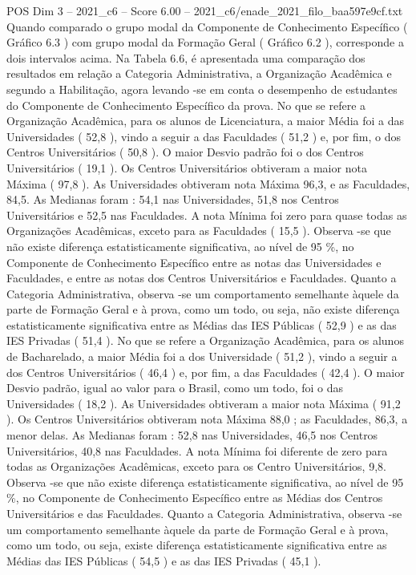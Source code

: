 \begin{textsample}{POS Dim 3 – 2021\_c6 – Score 6.00 – 2021\_c6/enade\_2021\_filo\_baa597e9cf.txt}
Quando comparado o grupo modal da Componente de Conhecimento Específico ( Gráfico 6.3 ) com grupo modal da Formação Geral ( Gráfico 6.2 ), corresponde a dois intervalos acima.
Na Tabela 6.6, é apresentada uma comparação dos resultados em relação a Categoria Administrativa, a Organização Acadêmica e segundo a Habilitação, agora levando -se em conta o desempenho de estudantes do Componente de Conhecimento Específico da prova.
No que se refere a Organização Acadêmica, para os alunos de Licenciatura, a maior Média foi a das Universidades ( 52,8 ), vindo a seguir a das Faculdades ( 51,2 ) e, por fim, o dos Centros Universitários ( 50,8 ).
O maior Desvio padrão foi o dos Centros Universitários ( 19,1 ).
Os Centros Universitários obtiveram a maior nota Máxima ( 97,8 ).
As Universidades obtiveram nota Máxima 96,3, e as Faculdades, 84,5.
As Medianas foram : 54,1 nas Universidades, 51,8 nos Centros Universitários e 52,5 nas Faculdades.
A nota Mínima foi zero para quase todas as Organizações Acadêmicas, exceto para as Faculdades ( 15,5 ).
Observa -se que não existe diferença estatisticamente significativa, ao nível de 95 \%, no Componente de Conhecimento Específico entre as notas das Universidades e Faculdades, e entre as notas dos Centros Universitários e Faculdades.
Quanto a Categoria Administrativa, observa -se um comportamento semelhante àquele da parte de Formação Geral e à prova, como um todo, ou seja, não existe diferença estatisticamente significativa entre as Médias das IES Públicas ( 52,9 ) e as das IES Privadas ( 51,4 ).
No que se refere a Organização Acadêmica, para os alunos de Bacharelado, a maior Média foi a dos Universidade ( 51,2 ), vindo a seguir a dos Centros Universitários ( 46,4 ) e, por fim, a das Faculdades ( 42,4 ).
O maior Desvio padrão, igual ao valor para o Brasil, como um todo, foi o das Universidades ( 18,2 ).
As Universidades obtiveram a maior nota Máxima ( 91,2 ).
Os Centros Universitários obtiveram nota Máxima 88,0 ; as Faculdades, 86,3, a menor delas.
As Medianas foram : 52,8 nas Universidades, 46,5 nos Centros Universitários, 40,8 nas Faculdades.
A nota Mínima foi diferente de zero para todas as Organizações Acadêmicas, exceto para os Centro Universitários, 9,8.
Observa -se que não existe diferença estatisticamente significativa, ao nível de 95 \%, no Componente de Conhecimento Específico entre as Médias dos Centros Universitários e das Faculdades.
Quanto a Categoria Administrativa, observa -se um comportamento semelhante àquele da parte de Formação Geral e à prova, como um todo, ou seja, existe diferença estatisticamente significativa entre as Médias das IES Públicas ( 54,5 ) e as das IES Privadas ( 45,1 ).

\end{textsample}
